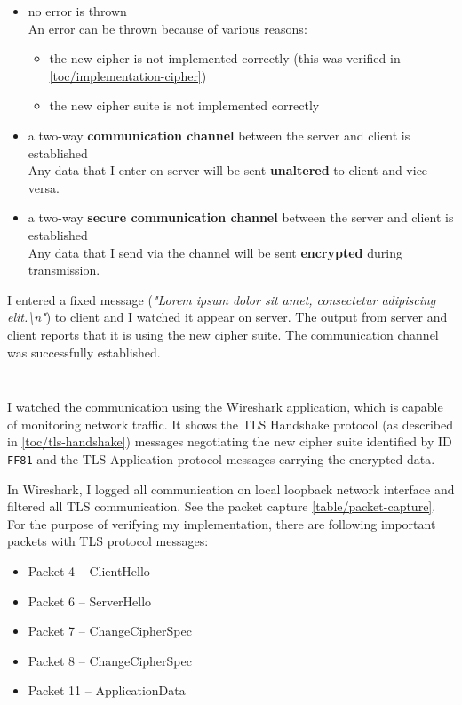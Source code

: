 \begin{itemize}
  \item no error is thrown \\ An error can be thrown because of various reasons:
  \begin{itemize}
    \item the new cipher is not implemented correctly (this was verified in \autoref{toc/implementation-cipher})
    \item the new cipher suite is not implemented correctly
  \end{itemize}
  \item a two-way \textbf{communication channel} between the server and client is established \\ Any data that I enter on server will be sent \textbf{unaltered} to client and vice versa.
  \item a two-way \textbf{secure communication channel} between the server and client is established \\ Any data that I send via the channel will be sent \textbf{encrypted} during transmission.
\end{itemize}

I entered a fixed message (\textit{"Lorem ipsum dolor sit amet, consectetur adipiscing elit.\textbackslash{}n"}) to client and I watched it appear on server. The output from server and client reports that it is using the new cipher suite. The communication channel was successfully established.

\inputminted{text}{code/caesar-s_client.txt}
\inputminted{text}{code/caesar-s_server.txt}

I watched the communication using the Wireshark application, which is capable of monitoring network traffic. It shows the TLS Handshake protocol (as described in \autoref{toc/tls-handshake}) messages negotiating the new cipher suite identified by ID \texttt{FF81} and the TLS Application protocol messages carrying the encrypted data.

In Wireshark, I logged all communication on local loopback network interface and filtered all TLS communication. See the packet capture \autoref{table/packet-capture}. For the purpose of verifying my implementation, there are following important packets with TLS protocol messages:



\begin{itemize}
  \item Packet 4 -- ClientHello
  \item Packet 6 -- ServerHello
  \item Packet 7 -- ChangeCipherSpec
  \item Packet 8 -- ChangeCipherSpec
  \item Packet 11 -- ApplicationData
\end{itemize}

